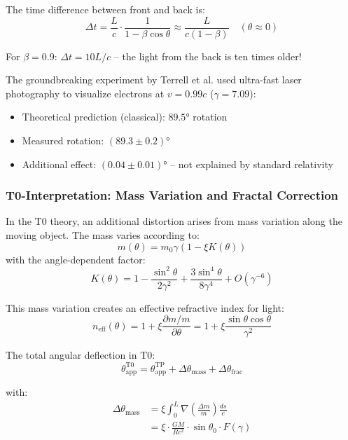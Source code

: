 	The time difference between front and back is:
	\begin{equation}
		\Delta t = \frac{L}{c} \cdot \frac{1}{1-\beta\cos\theta} \approx \frac{L}{c(1-\beta)} \quad (\theta \approx 0)
	\end{equation}
	
	For $\beta = 0.9$: $\Delta t = 10L/c$ – the light from the back is ten times older!
	
	The groundbreaking experiment by Terrell et al. \cite{terrell2025} used ultra-fast laser photography to visualize electrons at $v = 0.99c$ ($\gamma = 7.09$):
	\begin{itemize}
		\item Theoretical prediction (classical): $89.5°$ rotation
		\item Measured rotation: $(89.3 \pm 0.2)°$
		\item Additional effect: $(0.04 \pm 0.01)°$ – not explained by standard relativity
	\end{itemize}
	
	\subsubsection{T0-Interpretation: Mass Variation and Fractal Correction}
	
	In the T0 theory, an additional distortion arises from mass variation along the moving object. The mass varies according to:
	\begin{equation}
		m(\theta) = m_0\gamma\left(1 - \xi K(\theta)\right)
	\end{equation}
	with the angle-dependent factor:
	\begin{equation}
		K(\theta) = 1 - \frac{\sin^2\theta}{2\gamma^2} + \frac{3\sin^4\theta}{8\gamma^4} + O(\gamma^{-6})
	\end{equation}
	
	This mass variation creates an effective refractive index for light:
	\begin{equation}
		n_{\text{eff}}(\theta) = 1 + \xi \frac{\partial m/m}{\partial \theta} = 1 + \xi \frac{\sin\theta\cos\theta}{\gamma^2}
	\end{equation}
	
	The total angular deflection in T0:
	\begin{equation}
		\theta_{\text{app}}^{\text{T0}} = \theta_{\text{app}}^{\text{TP}} + \Delta\theta_{\text{mass}} + \Delta\theta_{\text{frac}}
	\end{equation}
	
	with:
	\begin{align}
		\Delta\theta_{\text{mass}} &= \xi \int_0^L \nabla\left(\frac{\Delta m}{m}\right) \frac{ds}{c} \\
		&= \xi \cdot \frac{GM}{Rc^2} \cdot \sin\theta_0 \cdot F(\gamma)
	\end{align}
	
